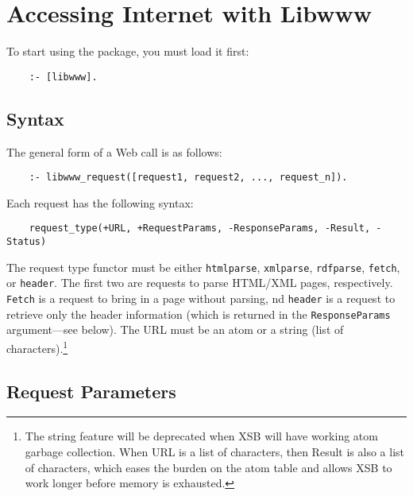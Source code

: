 \section{Accessing Internet with Libwww}

To start using the package, you must load it first:
\begin{verbatim}
    :- [libwww].  
\end{verbatim}

\subsection{Syntax}

The general form of a Web call is as follows:

\begin{verbatim}
    :- libwww_request([request1, request2, ..., request_n]).  
\end{verbatim}
Each request has the following syntax:
\begin{verbatim}
    request_type(+URL, +RequestParams, -ResponseParams, -Result, -Status)
\end{verbatim}
The request type functor must be either {\tt htmlparse}, {\tt xmlparse},
{\tt rdfparse}, {\tt fetch}, or {\tt header}. The first two are requests to
parse HTML/XML pages, respectively. {\tt Fetch} is a request to bring in a
page without parsing, nd {\tt header} is a request to retrieve only the
header information (which is returned in the {\tt ResponseParams}
argument---see below).
The URL must be an atom or a string (list of characters).\footnote{
  The string feature will be deprecated when XSB will have working atom
  garbage collection. When URL is a list of characters, then Result is also
  a list of characters, which eases the burden on the atom table and allows
  XSB to work longer before memory is exhausted.
  }

\subsection{Request Parameters}

